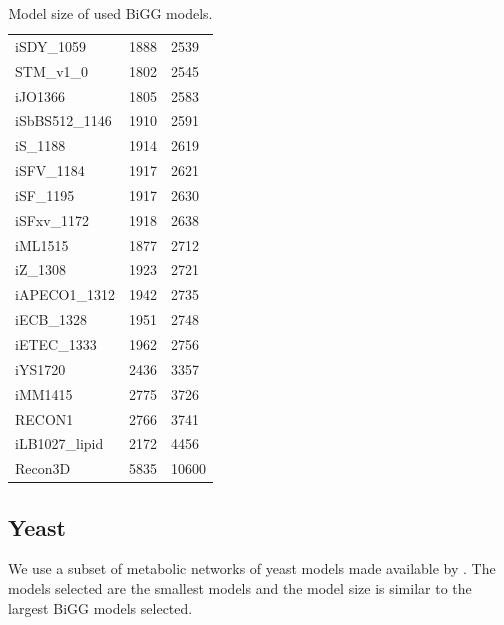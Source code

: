 \begin{table}[!ht]
\begin{tabular}{lll}
        \textsf{iSDY\_1059} & 1888 & 2539 \\ 
        \textsf{STM\_v1\_0} & 1802 & 2545 \\ 
        \textsf{iJO1366} & 1805 & 2583 \\ 
        \textsf{iSbBS512\_1146} & 1910 & 2591 \\ 
        \textsf{iS\_1188} & 1914 & 2619 \\ 
        \textsf{iSFV\_1184} & 1917 & 2621 \\ 
        \textsf{iSF\_1195} & 1917 & 2630 \\ 
        \textsf{iSFxv\_1172} & 1918 & 2638 \\ 
        \textsf{iML1515} & 1877 & 2712 \\ 
        \textsf{iZ\_1308} & 1923 & 2721 \\ 
        \textsf{iAPECO1\_1312} & 1942 & 2735 \\ 
        \textsf{iECB\_1328} & 1951 & 2748 \\ 
        \textsf{iETEC\_1333} & 1962 & 2756 \\ 
        \textsf{iYS1720} & 2436 & 3357 \\ 
        \textsf{iMM1415} & 2775 & 3726 \\ 
        \textsf{RECON1} & 2766 & 3741 \\ 
        \textsf{iLB1027\_lipid} & 2172 & 4456 \\ 
        \textsf{Recon3D} & 5835 & 10600 \\ \hline
    \end{tabular}
    \caption{\label{Tab:big_model_size} Model size of used BiGG models.}
\end{table}

\subsection{Yeast} \label{section:methods_yeast}
We use a subset of metabolic networks of yeast models made available by \cite{lu_yeast_2021}. The models selected are the smallest models and the model size is similar to the largest BiGG models selected.

